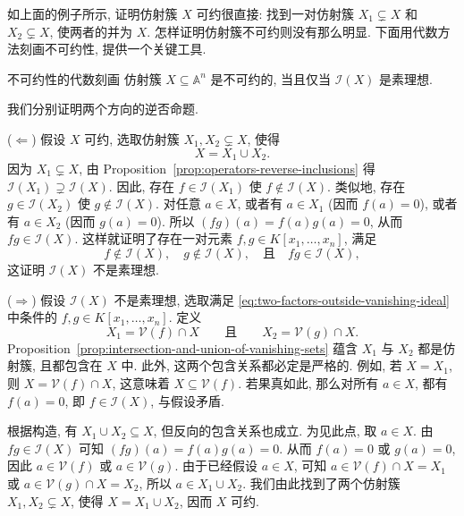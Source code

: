 如上面的例子所示, 证明仿射簇 $X$ 可约很直接: 找到一对仿射簇 $X_{1}\subsetneq X$ 和 $X_{2}\subsetneq X$, 使两者的并为 $X$. 怎样证明仿射簇不可约则没有那么明显. 下面用代数方法刻画不可约性, 提供一个关键工具.

\begin{Proposition}{不可约性的代数刻画}\leavevmode\label{prop:irreducible-iff-vanishing-ideal-prime}
  仿射簇 $X\subseteq\mathbb{A}^{n}$ 是不可约的, 当且仅当 $\mathcal{I}(X)$ 是素理想.
\end{Proposition}

\begin{Proof}
  我们分别证明两个方向的逆否命题.

  ($\Leftarrow$) 假设 $X$ 可约, 选取仿射簇 $X_{1},X_{2}\subsetneq X$, 使得
  \[
    X=X_{1}\cup X_{2}.
  \]
  因为 $X_{1}\subsetneq X$, 由 Proposition~\ref{prop:operators-reverse-inclusions} 得 $\mathcal{I}(X_{1})\supsetneq\mathcal{I}(X)$. 因此, 存在 $f\in\mathcal{I}(X_{1})$ 使 $f\notin\mathcal{I}(X)$. 类似地, 存在 $g\in\mathcal{I}(X_{2})$ 使 $g\notin\mathcal{I}(X)$. 对任意 $a\in X$, 或者有 $a\in X_{1}$ (因而 $f(a)=0$), 或者有 $a\in X_{2}$ (因而 $g(a)=0$). 所以 $(fg)(a)=f(a)g(a)=0$, 从而 $fg\in\mathcal{I}(X)$. 这样就证明了存在一对元素 $f,g\in K[x_{1},\ldots,x_{n}]$, 满足
  \begin{equation}\label{eq:two-factors-outside-vanishing-ideal}
    f\notin\mathcal{I}(X),\quad g\notin\mathcal{I}(X),\quad\text{且}\quad fg\in\mathcal{I}(X),
  \end{equation}
  这证明 $\mathcal{I}(X)$ 不是素理想.

  ($\Rightarrow$) 假设 $\mathcal{I}(X)$ 不是素理想, 选取满足 \eqref{eq:two-factors-outside-vanishing-ideal} 中条件的 $f,g\in K[x_{1},\ldots,x_{n}]$. 定义
  \[
    X_{1}=\mathcal{V}(f)\cap X \qquad\text{且}\qquad X_{2}=\mathcal{V}(g)\cap X.
  \]
  Proposition~\ref{prop:intersection-and-union-of-vanishing-sets} 蕴含 $X_{1}$ 与 $X_{2}$ 都是仿射簇, 且都包含在 $X$ 中. 此外, 这两个包含关系都必定是严格的. 例如, 若 $X=X_{1}$, 则 $X=\mathcal{V}(f)\cap X$, 这意味着 $X\subseteq\mathcal{V}(f)$. 若果真如此, 那么对所有 $a\in X$, 都有 $f(a)=0$, 即 $f\in\mathcal{I}(X)$, 与假设矛盾.

  根据构造, 有 $X_{1}\cup X_{2}\subseteq X$, 但反向的包含关系也成立. 为见此点, 取 $a\in X$. 由 $fg\in\mathcal{I}(X)$ 可知 $(fg)(a)=f(a)g(a)=0$. 从而 $f(a)=0$ 或 $g(a)=0$, 因此 $a\in\mathcal{V}(f)$ 或 $a\in\mathcal{V}(g)$. 由于已经假设 $a\in X$, 可知 $a\in\mathcal{V}(f)\cap X=X_{1}$ 或 $a\in\mathcal{V}(g)\cap X=X_{2}$, 所以 $a\in X_{1}\cup X_{2}$. 我们由此找到了两个仿射簇 $X_{1},X_{2}\subsetneq X$, 使得 $X=X_{1}\cup X_{2}$, 因而 $X$ 可约.
\end{Proof}

